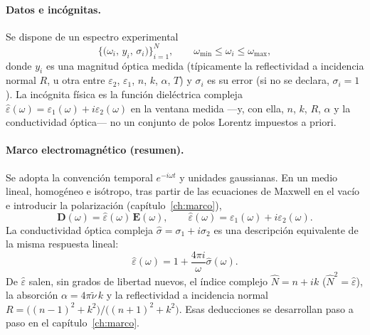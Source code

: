 \paragraph{Datos e inc\'ognitas.}
Se dispone de un espectro experimental
\begin{equation}
\bigl\{\bigl(\omega_i,\,y_i,\,\sigma_i\bigr)\bigr\}_{i=1}^{N},
\qquad
\omega_{\min}\le\omega_i\le\omega_{\max},
\end{equation}
donde $y_i$ es una magnitud \'optica medida (t\'ipicamente la reflectividad a incidencia normal $R$, u otra entre $\varepsilon_2$, $\varepsilon_1$, $n$, $k$, $\alpha$, $T$) y $\sigma_i$ es su error (si no se declara, $\sigma_i=1$).
La inc\'ognita f\'isica es la funci\'on diel\'ectrica compleja $\hat\varepsilon(\omega)=\varepsilon_1(\omega)+i\varepsilon_2(\omega)$ en la ventana medida ---y, con ella, $n$, $k$, $R$, $\alpha$ y la conductividad \'optica--- no un conjunto de polos Lorentz impuestos a priori.

\paragraph{Marco electromagn\'etico (resumen).}
Se adopta la convenci\'on temporal $e^{-i\omega t}$ y unidades gaussianas.
En un medio lineal, homog\'eneo e is\'otropo, tras partir de las ecuaciones de Maxwell en el vac\'io e introducir la polarizaci\'on (cap\'itulo~\ref{ch:marco}),
\begin{equation}
\mathbf{D}(\omega)=\hat\varepsilon(\omega)\,\mathbf{E}(\omega),
\qquad
\hat\varepsilon(\omega)=\varepsilon_1(\omega)+i\varepsilon_2(\omega).
\end{equation}
La conductividad \'optica compleja $\hat\sigma=\sigma_1+i\sigma_2$ es una descripci\'on equivalente de la misma respuesta lineal:
\begin{equation}
\label{eq:eps-sigma}
\hat\varepsilon(\omega)=1+\frac{4\pi i}{\omega}\hat\sigma(\omega).
\end{equation}
De $\hat\varepsilon$ salen, sin grados de libertad nuevos, el \'indice complejo $\hat N=n+ik$ ($\hat N^{2}=\hat\varepsilon$),
la absorci\'on $\alpha=4\pi\tilde\nu\,k$ y la reflectividad a incidencia normal
$R=\bigl((n-1)^{2}+k^{2}\bigr)/\bigl((n+1)^{2}+k^{2}\bigr)$.
Esas deducciones se desarrollan paso a paso en el cap\'itulo~\ref{ch:marco}.

